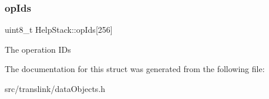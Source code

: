 \subsubsection{\texorpdfstring{op\+Ids}{opIds}}
{\footnotesize\ttfamily uint8\+\_\+t Help\+Stack\+::op\+Ids\mbox{[}256\mbox{]}}

The operation I\+Ds 

The documentation for this struct was generated from the following file\+:\begin{DoxyCompactItemize}
\item 
src/translink/data\+Objects.\+h\end{DoxyCompactItemize}
